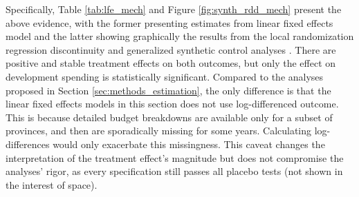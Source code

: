 \documentclass[12pt]{article}
\newcommand{\1}{\mathbbm{1}}
\begin{document}
Specifically, Table \ref{tab:lfe_mech} and Figure \ref{fig:synth_rdd_mech} present the above evidence, with the former presenting estimates from linear fixed effects model and the latter showing graphically the results from the local randomization regression discontinuity \citep{CattaneoTitiunik2015} and generalized synthetic control analyses \citep{Xu2017gsynth}. There are positive and stable treatment effects on both outcomes, but only the effect on development spending is statistically significant. Compared to the analyses proposed in Section \ref{sec:methods_estimation}, the only difference is that the linear fixed effects models in this section does not use log-differenced outcome. This is because detailed budget breakdowns are available only for a subset of provinces, and then are sporadically missing for some years. Calculating log-differences would only exacerbate this missingness. This caveat changes the interpretation of the treatment effect's magnitude but does not compromise the analyses' rigor, as every specification still passes all placebo tests (not shown in the interest of space).
\end{document}

